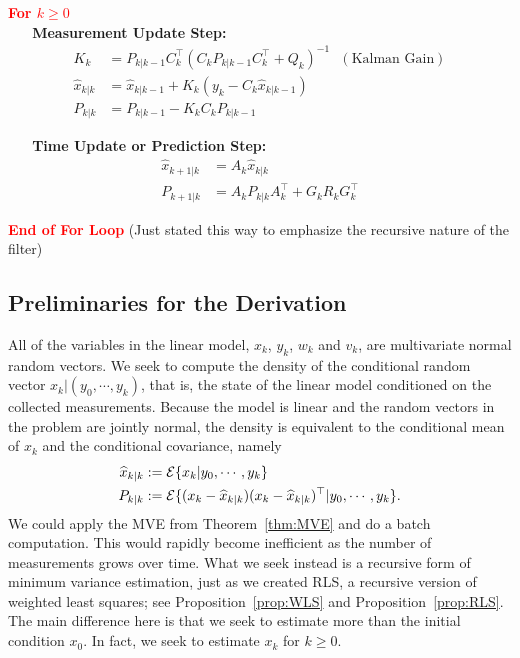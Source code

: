 \textcolor{red}{\bf For $k \ge 0$}\\

\textbf{~~~Measurement Update Step:}
\begin{align*}
K_k &= P_{k|k-1}C_k^\top \left(C_k P_{k|k-1} C_k^\top + Q_k\right)^{-1} ~~~(\text{Kalman Gain})\\
\widehat{x}_{k|k} &= \widehat{x}_{k|k-1}  + K_k \left( y_k - C_k \widehat{x}_{k|k-1} \right) \\
P_{k|k} &= P_{k|k-1} - K_k C_k  P_{k|k-1}
\end{align*}

\textbf{~~~Time Update or Prediction Step:}
\begin{align*}
\widehat{x}_{k+1|k} &= A_k \widehat{x}_{k|k}  \\
P_{k+1|k} &= A_k P_{k|k} A_k^\top + G_k R_k G_k^\top
\end{align*}

\textcolor{red}{\bf End of For Loop} (Just stated this way to emphasize the recursive nature of the filter)

\subsection{Preliminaries for the Derivation}

All of the variables in the linear model, $x_k$, $y_k$, $w_k$ and $v_k$, are multivariate normal random vectors. We seek to compute the density of the conditional random vector $x_k\big|({y_0, \cdots, y_k})$, that is, the state of the linear model conditioned on the collected measurements. Because the model is linear and the random vectors in the problem are jointly normal, the density is equivalent to the conditional mean of $x_k$ and the conditional covariance, namely
\begin{align*}
\widehat{x}_{k|k} &:= {\cal E} \{ x_k | y_0, \cdots, y_k \}\\
P_{k|k} &:={\cal E} \{ (x_k-\widehat{x}_{k|k})(x_k-\widehat{x}_{k|k})^\top | y_0, \cdots, y_k \}.\\
\end{align*}
We could apply the MVE from Theorem~\ref{thm:MVE} and do a batch computation. This would rapidly become inefficient as the number of measurements grows over time. What we seek instead is a recursive form of minimum variance estimation, just as we created RLS, a recursive version of weighted least squares; see Proposition~\ref{prop:WLS} and Proposition~\ref{prop:RLS}. The main difference here is that we seek to estimate more than the initial condition $x_0$. In fact, we seek to estimate $x_k$ for $k\ge 0$. 

